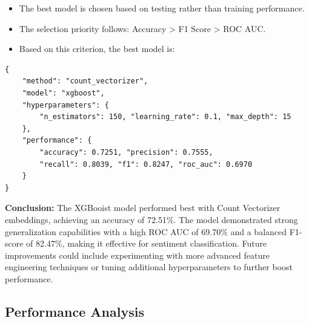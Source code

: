 \begin{itemize}
    \item The best model is chosen based on testing rather than training performance.
    \item The selection priority follows: Accuracy > F1 Score > ROC AUC.
    \item Based on this criterion, the best model is:
\end{itemize}

\begin{verbatim}
{
    "method": "count_vectorizer",
    "model": "xgboost",
    "hyperparameters": {
        "n_estimators": 150, "learning_rate": 0.1, "max_depth": 15
    },
    "performance": {
        "accuracy": 0.7251, "precision": 0.7555,
        "recall": 0.8039, "f1": 0.8247, "roc_auc": 0.6970
    }
}
\end{verbatim}

\textbf{Conclusion:} The XGBooist model performed best with Count Vectorizer embeddings, achieving an accuracy of 72.51\%. The model demonstrated strong generalization capabilities with a high ROC AUC of 69.70\% and a balanced F1-score of 82.47\%, making it effective for sentiment classification. Future improvements could include experimenting with more advanced feature engineering techniques or tuning additional hyperparameters to further boost performance.

\subsection{Performance Analysis}

